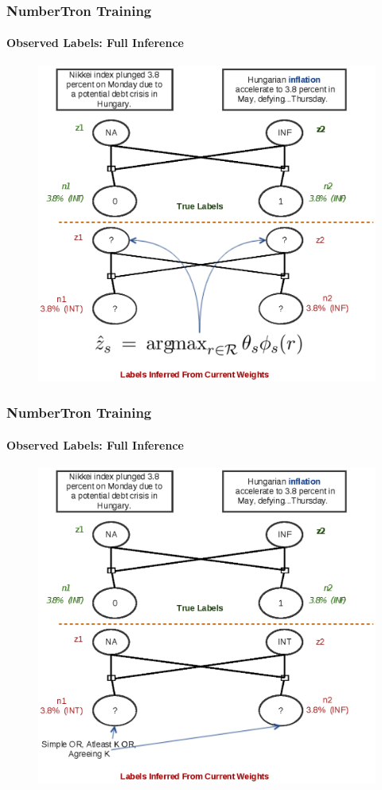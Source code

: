 \documentclass{beamer}
\begin{document}
\begin{frame}
\frametitle{NumberTron Training}
\framesubtitle{Observed Labels: Full Inference}
\begin{figure}
\includegraphics[width=\textwidth, height=0.85\textheight]{images/fullinf_1.eps}
\end{figure}
\end{frame}


\begin{frame}
\frametitle{NumberTron Training}
\framesubtitle{Observed Labels: Full Inference}
\begin{figure}
\includegraphics[width=\textwidth, height=0.85\textheight]{images/fullinf_2.eps}
\end{figure}
\end{frame}
\end{document}
